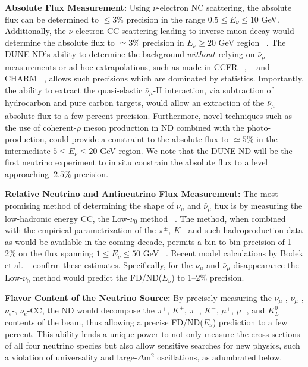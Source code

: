 \vspace{0.25cm} 
\noindent 
{\bf Absolute Flux Measurement:} Using  $\nu$-electron NC scattering, the absolute flux can be determined 
to $\leq 3\%$ precision in the range $0.5 \leq E_\nu \leq 10$ GeV. Additionally, the $\nu$-electron CC scattering leading to  inverse 
muon decay would determine the absolute flux to $\simeq 3\%$ precision in $E_\nu \geq 20$ GeV region 
~\cite{ABS-FLUX}. 
The DUNE-ND's ability to determine the background $without$ relying on $\bar \nu_\mu$ measurements or 
ad hoc extrapolations, such as made in CCFR ~\cite{CCFR-IMD-Mishra-89}, ~\cite{CCFR-IMD-Mishra-90} 
and CHARM ~\cite{CHARM-IMD-95}, allows such precisions which are dominated by statistics. 
Importantly, the ability to extract the quasi-elastic 
$\bar \nu_\mu$-H interaction, via subtraction of hydrocarbon and pure carbon targets, would allow an extraction of 
the $\bar \nu_\mu$ absolute flux to a few percent precision. Furthermore, novel techniques such as the use of 
coherent-$\rho$ meson production in ND combined with the photo-production, could provide a constraint 
to the absolute flux to $\simeq 5\%$ in the intermediate $5 \leq E_\nu \leq 20$ GeV region. 
We note that the DUNE-ND will be the first neutrino experiment to in situ constrain the absolute flux 
to a level approaching $~2.5\%$ precision. 

\vspace{0.25cm} 
 
\noindent 
{\bf Relative Neutrino and Antineutrino Flux Measurement:} The most promising method of determining 
the shape of  $\nu_\mu$ and $\bar \nu_\mu$ flux is by measuring the low-hadronic energy CC, the Low-$\nu_0$ method ~\cite{MISHRA-Nu0}. The method, when combined with the empirical parametrization of the $\pi^{\pm}$, $K^{\pm}$ 
and such hadroproduction data as would be available in the coming decade, permits a bin-to-bin precision of 1--2\% on 
the flux spanning $1 \leq E_\nu \leq 50$ GeV ~\cite{ND-REL-FLUX}. 
Recent model calculations by Bodek et al. ~\cite{Bodek:2012uu} confirm these estimates. 
Specifically, for the $\nu_\mu$ and $\bar \nu_\mu$ disappearance the Low-$\nu_0$ method would predict the 
FD/ND($E_\nu$) to 1--2\% precision. 

\vspace{0.25cm} 
\noindent 
{\bf Flavor Content of the Neutrino Source:} By precisely measuring the $\nu_\mu$-, $\bar \nu_\mu$-, $\nu_e$-, $\bar \nu_e$-CC, 
the ND would decompose the $\pi^+$, $K^+$, $\pi^-$, $K^-$, $\mu^+$, $\mu^-$, and $K^0_L$ contents of the beam, thus 
allowing a precise FD/ND($E_\nu$) prediction to a few percent.  This ability lends a unique power to 
not only measure the cross-sections of all four neutrino species but also allow sensitive searches for new 
physics, such a violation of universality and large-$\Delta$m$^2$ oscillations,  as adumbrated below. 

